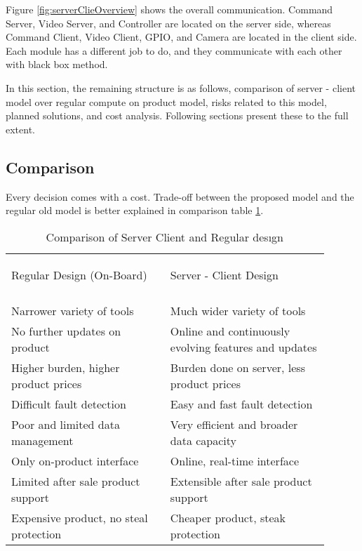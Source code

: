 
Figure \ref{fig:serverClieOverview} shows the overall communication. Command Server, Video Server, and Controller are located on the server side, whereas Command Client, Video Client, GPIO, and Camera are located in the client side. Each module has a different job to do, and they communicate with each other with black box method.




In this section, the remaining structure is as follows, comparison of server - client model over regular compute on product model, risks related to this model, planned solutions, and cost analysis. Following sections present these to the full extent. 

\subsection{Comparison}
Every decision comes with a cost. Trade-off between the proposed model and the regular old model is better explained in comparison table \ref{table:serverCliComparison}. 

\begin{table}
\begin{tabular}{|p{0.45\linewidth}|p{0.45\linewidth}|}
\begin{center}
Regular Design (On-Board)
\end{center}
&
\begin{center}
Server - Client Design
\end{center}
\\
\\

\hline
Narrower variety of tools   & Much wider variety of tools \\
\hline
No further updates on product & Online and continuously evolving features and updates\\
\hline
Higher  burden, higher product prices & Burden done on server, less product prices\\
\hline
Difficult fault detection & Easy and fast fault detection\\
\hline
Poor and limited data management & Very efficient and broader data capacity\\ 
\hline
Only on-product interface & Online, real-time interface\\
\hline
Limited after sale product support & Extensible after sale product support\\
\hline
Expensive product, no steal protection & Cheaper product, steak protection\\
\hline

\end{tabular}
\caption{Comparison of Server Client and Regular desıgn}
\label{table:serverCliComparison}
\end{table}

